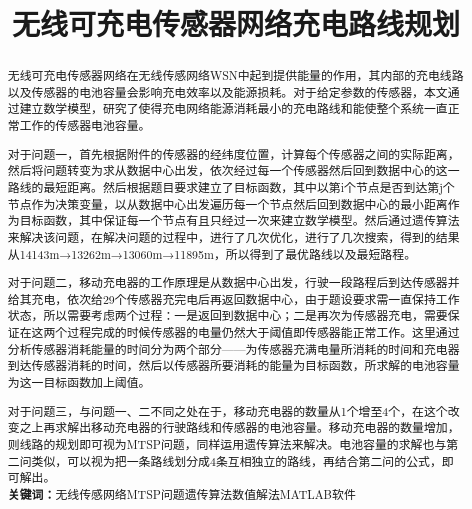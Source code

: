 \documentclass{article}
\title{\zihao{-2}无线可充电传感器网络充电路线规划\vspace{-2em}}
\date{}     %
\author{}   %
\begin{document}
\setlength{\parindent}{2em}         
\maketitle                                                  %
\thispagestyle{empty}                                       %
\begin{abstract}                                            %
{                                                 %
无线可充电传感器网络在无线传感网络WSN中起到提供能量的作用，其内部的充电线路以及传感器的电池容量会影响充电效率以及能源损耗。对于给定参数的传感器，本文通过建立数学模型，研究了使得充电网络能源消耗最小的充电路线和能使整个系统一直正常工作的传感器电池容量。

对于问题一，首先根据附件的传感器的经纬度位置，计算每个传感器之间的实际距离，然后将问题转变为求从数据中心出发，依次经过每一个传感器然后回到数据中心的这一路线的最短距离。然后根据题目要求建立了目标函数，其中以第i个节点是否到达第j个节点作为决策变量，以从数据中心出发遍历每一个节点然后回到数据中心的最小距离作为目标函数，其中保证每一个节点有且只经过一次来建立数学模型。然后通过遗传算法来解决该问题，在解决问题的过程中，进行了几次优化，进行了几次搜索，得到的结果从14143m→13262m→13060m→11895m，所以得到了最优路线以及最短路程。

对于问题二，移动充电器的工作原理是从数据中心出发，行驶一段路程后到达传感器并给其充电，依次给29个传感器充完电后再返回数据中心，由于题设要求需一直保持工作状态，所以需要考虑两个过程：一是返回到数据中心；二是再次为传感器充电，需要保证在这两个过程完成的时候传感器的电量仍然大于阈值即传感器能正常工作。这里通过分析传感器消耗能量的时间分为两个部分——为传感器充满电量所消耗的时间和充电器到达传感器消耗的时间，然后以传感器所要消耗的能量为目标函数，所求解的电池容量为这一目标函数加上阈值。

\setlength{\baselineskip}{20pt}     对于问题三，与问题一、二不同之处在于，移动充电器的数量从1个增至4个，在这个改变之上再求解出移动充电器的行驶路线和传感器的电池容量。移动充电器的数量增加，则线路的规划即可视为MTSP问题，同样运用遗传算法来解决。电池容量的求解也与第二问类似，可以视为把一条路线划分成4条互相独立的路线，再结合第二问的公式，即可解出。\\

\noindent \textbf{关键词：}无线传感网络\quad MTSP问题\quad 遗传算法\quad 数值解法\quad MATLAB软件
}
\thispagestyle{empty}
\end{abstract}                                              %
\newpage                                                    %
\setcounter{page}{1}                                        %
\end{document}
